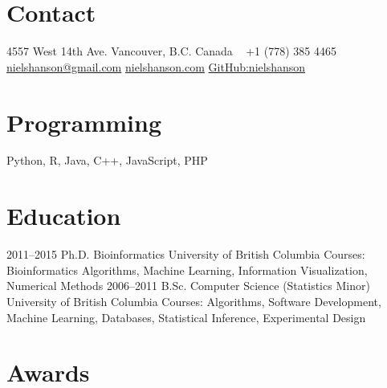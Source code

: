 \documentclass[print]{hanson_cv} %
\begin{document}


\begin{aside} %
\section{Contact}
4557 West 14th Ave.
Vancouver, B.C.
Canada
~
+1 (778) 385 4465
~
\href{mailto:nielshanson@gmail.com}{nielshanson@gmail.com}
\href{http://www.nielshanson.com}{nielshanson.com}
\href{http://www.github.com/nielshanson}{GitHub:nielshanson}
\section{Programming}
Python, R, Java, C++, JavaScript, PHP
\end{aside}


\section{Education}

\begin{entrylist}
\entry
{2011--2015}
{Ph.D. {\normalfont  Bioinformatics}}
{University of British Columbia}
{Courses: Bioinformatics Algorithms, Machine Learning, Information Visualization, Numerical Methods}
\entry
{2006--2011}
{B.Sc. {\normalfont  Computer Science (Statistics Minor)}}
{University of British Columbia}
{Courses: Algorithms, Software Development, Machine Learning, Databases, Statistical Inference, Experimental Design}

\end{entrylist}

\section{Awards}
\end{document}
